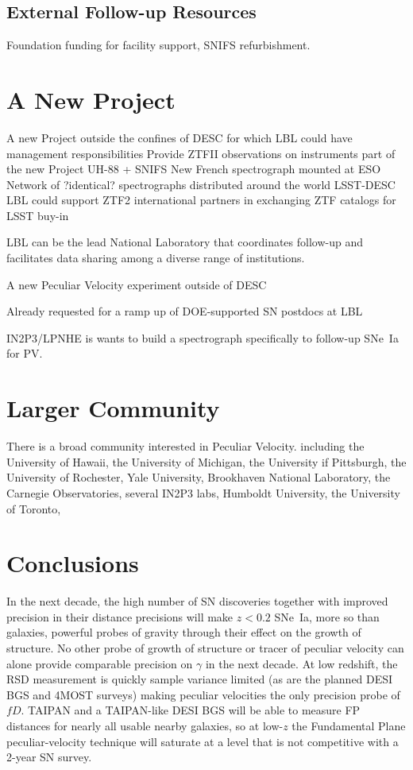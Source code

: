 \documentclass[11pt, oneside]{article}   	%
\begin{document}
\subsection{External Follow-up Resources}
Foundation funding for facility support, SNIFS refurbishment.

\section{A New Project}

A new Project outside the confines of DESC for which LBL could have management responsibilities
Provide ZTFII observations on instruments part of the new Project
UH-88 + SNIFS
New French spectrograph mounted at ESO
Network of ?identical? spectrographs distributed around the world
LSST-DESC
LBL could support ZTF2 international partners in exchanging ZTF catalogs for LSST buy-in

LBL can be the lead National Laboratory that coordinates follow-up and facilitates data sharing among a diverse range of institutions.  

A new Peculiar Velocity experiment outside of DESC

Already requested for a ramp up of DOE-supported SN postdocs at LBL

IN2P3/LPNHE is wants to build a spectrograph specifically to follow-up SNe~Ia for PV.


\section{Larger Community}
There is a broad community interested in Peculiar Velocity. 
including the  University of Hawaii, the University of Michigan, the University if Pittsburgh, the University of Rochester, Yale University,  Brookhaven National Laboratory,
the Carnegie Observatories, several IN2P3 labs, Humboldt University, the University of Toronto, 

\section{Conclusions}

In the next decade,
the high number of SN discoveries together with improved precision in their distance precisions will make $z<0.2$ SNe~Ia, more so than
galaxies,  powerful probes of gravity through their effect  on the growth of structure.  No other probe of growth of structure or tracer of peculiar velocity can alone provide comparable precision on  $\gamma$ in the next decade.
At low redshift, the RSD measurement is quickly sample variance limited (as are the planned DESI BGS and 4MOST surveys) making peculiar velocities the only 
precision probe of $fD$.
TAIPAN and a TAIPAN-like DESI BGS will be able to measure FP distances for nearly all usable nearby galaxies, so at low-$z$ the Fundamental Plane peculiar-velocity
technique will  saturate at a level that is not competitive with a  2-year SN survey.





\end{document}
